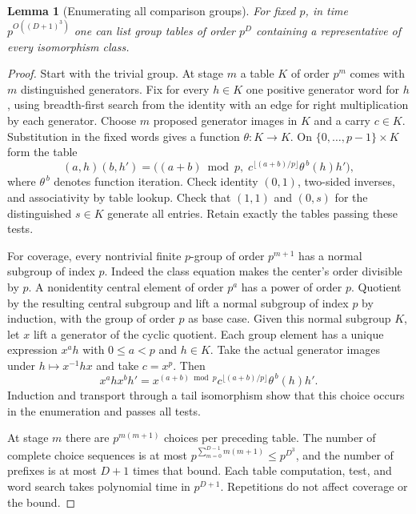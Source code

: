 \documentclass[11pt]{article}
\newtheorem{lemma}[theorem]{Lemma}
\theoremstyle{definition}
\theoremstyle{remark}
\numberwithin{equation}{section}
\begin{document}
\begin{lemma}[Enumerating all comparison groups]
\label{hu:enumeration}
For fixed $p$, in time $p^{O((D+1)^3)}$ one can list group tables of
order $p^D$ containing a representative of every isomorphism class.
\end{lemma}
\begin{proof}
Start with the trivial group. At stage $m$ a table $K$ of order
$p^m$ comes with $m$ distinguished generators. Fix for every $h\in K$
one positive generator word for $h$, using breadth-first search from
the identity with an edge for right multiplication by each generator.
Choose $m$ proposed generator images in $K$ and a carry $c\in K$.
Substitution in the fixed words gives a function $\theta:K\to K$.
On $\{0,\ldots,p-1\}\times K$ form the table
\[
 (a,h)(b,h')=
 \bigl((a+b)\bmod p,\;
      c^{\lfloor(a+b)/p\rfloor}\theta^{\,b}(h)h'\bigr),
\]
where $\theta^{\,b}$ denotes function iteration. Check identity
$(0,1)$, two-sided inverses, and associativity by table lookup.
Check that $(1,1)$ and $(0,s)$ for the distinguished $s\in K$
generate all entries. Retain exactly the tables passing these tests.

For coverage, every nontrivial finite $p$-group of order $p^{m+1}$
has a normal subgroup of index $p$. Indeed the class equation makes
the center's order divisible by $p$. A nonidentity central element
of order $p^a$ has a power of order $p$. Quotient by the resulting
central subgroup and lift a normal subgroup of index $p$ by
induction, with the group of order $p$ as base case. Given this
normal subgroup $K$, let $x$ lift a generator of the cyclic
quotient. Each group element has a unique expression $x^a h$ with
$0\le a<p$ and $h\in K$. Take the actual generator images under
$h\mapsto x^{-1}hx$ and take $c=x^p$. Then
\[
 x^ahx^bh'=x^{(a+b)\bmod p}
    c^{\lfloor(a+b)/p\rfloor}\theta^{\,b}(h)h'.
\]
Induction and transport through a tail isomorphism show that this
choice occurs in the enumeration and passes all tests.

At stage $m$ there are $p^{m(m+1)}$ choices per preceding table.
The number of complete choice sequences is at most
$p^{\sum_{m=0}^{D-1}m(m+1)}\le p^{D^3}$, and the number of prefixes
is at most $D+1$ times that bound. Each table computation, test,
and word search takes polynomial time in $p^{D+1}$. Repetitions do
not affect coverage or the bound.
\end{proof}
\end{document}
